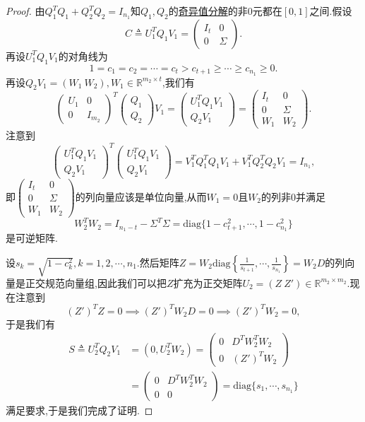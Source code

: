 \documentclass[../../main.tex]{subfiles}%
\begin{document}
\begin{proof}
由\( Q_1^T Q_1 + Q_2^T Q_2 = I_{n_1} \)知\( Q_1, Q_2 \)的\hyperref[theorem:奇异值分解]{奇异值分解}的非0元都在\([0, 1]\)之间.假设
\[
C \triangleq U_1^T Q_1 V_1 = \begin{pmatrix}
I_t & 0 \\
0 & \Sigma
\end{pmatrix}.
\]
再设\( U_1^T Q_1 V_1 \)的对角线为
\[
1 = c_1 = c_2 = \cdots = c_t > c_{t + 1} \geqslant  \cdots \geqslant  c_{n_1} \geqslant  0.
\]
再设\( Q_2 V_1 = (W_1\ W_2), W_1 \in \mathbb{R}^{m_2 \times t} \),我们有
\[
\begin{pmatrix}
U_1 & 0 \\
0 & I_{m_2}
\end{pmatrix}^T \begin{pmatrix}
Q_1 \\
Q_2
\end{pmatrix} V_1 = \begin{pmatrix}
U_1^T Q_1 V_1 \\
Q_2 V_1
\end{pmatrix} = \begin{pmatrix}
I_t & 0 \\
0 & \Sigma \\
W_1 & W_2
\end{pmatrix}.
\]
注意到
\[
\begin{pmatrix}
U_1^T Q_1 V_1 \\
Q_2 V_1
\end{pmatrix}^T \begin{pmatrix}
U_1^T Q_1 V_1 \\
Q_2 V_1
\end{pmatrix} = V_1^T Q_1^T Q_1 V_1 + V_1^T Q_2^T Q_2 V_1 = I_{n_1},
\]
即\( \begin{pmatrix}
I_t & 0 \\
0 & \Sigma \\
W_1 & W_2
\end{pmatrix} \)的列向量应该是单位向量,从而\( W_1 = 0 \)且\( W_2 \)的列非0并满足
\[
W_2^T W_2 = I_{n_1 - t} - \Sigma^T \Sigma = \text{diag}\{1 - c_{t + 1}^2, \cdots, 1 - c_{n_1}^2\}
\]
是可逆矩阵.

设\( s_k = \sqrt{1 - c_k^2}, k = 1, 2, \cdots, n_1 \).然后矩阵\( Z = W_2 \text{diag}\left\{ \frac{1}{s_{t + 1}}, \cdots, \frac{1}{s_{n_1}} \right\} = W_2 D \)的列向量是正交规范向量组,因此我们可以把\( Z \)扩充为正交矩阵\( U_2 = (Z\ Z') \in \mathbb{R}^{m_2 \times m_2} \).现在注意到
\[
(Z')^T Z = 0 \implies (Z')^T W_2 D = 0 \implies (Z')^T W_2 = 0,
\]
于是我们有
\[
\begin{aligned}
S \triangleq U_2^T Q_2 V_1 &= (0, U_2^T W_2) = \begin{pmatrix}
0 & D^T W_2^T W_2 \\
0 & (Z')^T W_2
\end{pmatrix} \\
&= \begin{pmatrix}
0 & D^T W_2^T W_2 \\
0 & 0
\end{pmatrix} = \text{diag}\{s_1, \cdots, s_{n_1}\}
\end{aligned}
\]
满足要求,于是我们完成了证明.
\end{proof}
\end{document}
